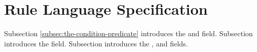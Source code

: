\chapter{Rule Language Specification}\label{ch:rule-language-specification}

Subsection \ref{subsec:the-condition-predicate} introduces the  and   field.
Subsection \addref introduces the  field.
Subsection \addref introduces the ,  and  fields.






